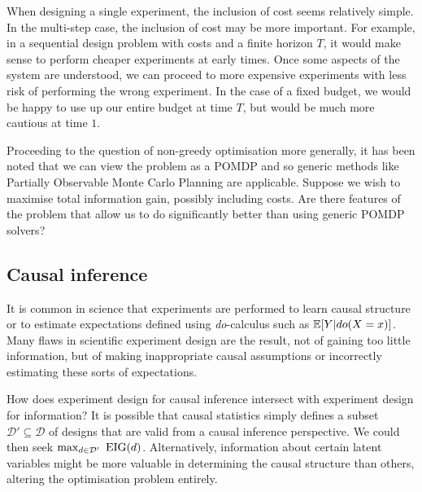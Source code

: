 When designing a single experiment, the inclusion of cost seems relatively simple. In the multi-step case, the inclusion of cost may be more important. For example, in a sequential design problem with costs and a finite horizon $T$, it would make sense to perform cheaper experiments at early times. Once some aspects of the system are understood, we can proceed to more expensive experiments with less risk of performing the wrong experiment. In the case of a fixed budget, we would be happy to use up our entire budget at time $T$, but would be much more cautious at time $1$.

Proceeding to the question of non-greedy optimisation more generally, it has been noted that we can view the problem as a POMDP and so generic methods like Partially Observable Monte Carlo Planning \cite{pomcp} are applicable. Suppose we wish to maximise total information gain, possibly including costs. Are there features of the problem that allow us to do significantly better than using generic POMDP solvers?

\subsection{Causal inference}
It is common in science that experiments are performed to learn causal structure or to estimate expectations defined using \textit{do}-calculus \cite{pearl2009causal} such as $\mathbb{E}[Y | do(X=x)]$. Many flaws in scientific experiment design are the result, not of gaining too little information, but of making inappropriate causal assumptions or incorrectly estimating these sorts of expectations.

How does experiment design for causal inference intersect with experiment design for information? It is possible that causal statistics simply defines a subset $\mathcal{D}' \subseteq \mathcal{D}$ of designs that are valid from a causal inference perspective. We could then seek $\max_{d\in\mathcal{D}'}\ \eig(d)$. Alternatively, information about certain latent variables might be more valuable in determining the causal structure than others, altering the optimisation problem entirely.


